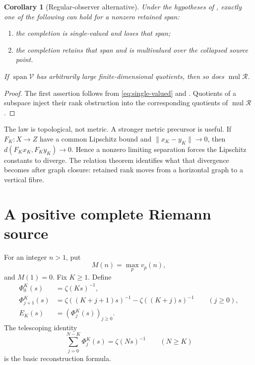\documentclass[11pt]{article}
\newtheorem{corollary}[theorem]{Corollary}
\theoremstyle{definition}
\theoremstyle{remark}
\newcommand{\cR}{\mathcal R}
\newcommand{\mul}{\operatorname{mul}}
\newcommand{\Span}{\operatorname{span}}
\begin{document}
\begin{corollary}[Regular-observer alternative]\label{cor:dichotomy}
Under the hypotheses of , exactly one of the following can
hold for a nonzero retained span:
\begin{enumerate}[label=\textup{(\alph*)},leftmargin=2em]
\item the completion is single-valued and loses that span;
\item the completion retains that span and is multivalued over the collapsed
      source point.
\end{enumerate}
If \(\Span\mathcal V\) has arbitrarily large finite-dimensional quotients,
then so does \(\mul\cR\).
\end{corollary}

\begin{proof}
The first assertion follows from \eqref{eq:single-valued} and
.  Quotients of a subspace inject their rank obstruction
into the corresponding quotients of \(\mul\cR\).
\end{proof}

The law is topological, not metric.  A stronger metric precursor is useful.
If \(F_K:X\to Z\) have a common Lipschitz bound and
\(\|x_K-y_K\|\to0\), then \(d(F_Kx_K,F_Ky_K)\to0\).  Hence a nonzero limiting
separation forces the Lipschitz constants to diverge.  The relation theorem
identifies what that divergence becomes after graph closure: retained rank
moves from a horizontal graph to a vertical fibre.

\section{A positive complete Riemann source}

For an integer \(n>1\), put
\[
                         M(n)=\max_{p}v_p(n),
\tag{3.1}\label{eq:max-valuation}
\]
and \(M(1)=0\).  Fix \(K\geq1\).  Define
\[
\begin{aligned}
 \Phi^K_0(s)&=\zeta(Ks)^{-1},\\
 \Phi^K_{j+1}(s)&=\zeta((K+j+1)s)^{-1}
                   -\zeta((K+j)s)^{-1}\qquad(j\geq0),\\
 E_K(s)&=(\Phi^K_j(s))_{j\geq0}.
\end{aligned}
\tag{3.2}\label{eq:complete-source}
\]
The telescoping identity
\[
       \sum_{j=0}^{N-K}\Phi^K_j(s)=\zeta(Ns)^{-1}
       \qquad(N\geq K)
\tag{3.3}\label{eq:telescoping}
\]
is the basic reconstruction formula.
\end{document}

